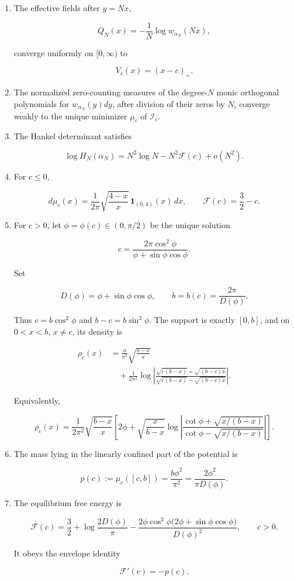 \documentclass[11pt]{article}
\theoremstyle{keio}
\theoremstyle{definition}
\theoremstyle{remark}
\begin{document}
\begin{enumerate}
\def\labelenumi{\arabic{enumi}.}
\item
  The effective fields after \(y=Nx\),

  \[
  Q_N(x)=-\frac1N\log w_{\alpha_N}(Nx),
  \]

  converge uniformly on \([0,\infty)\) to

  \[
  V_c(x)=(x-c)_+.
  \]
\item
  The normalized zero-counting measures of the degree-\(N\) monic
  orthogonal polynomials for \(w_{\alpha_N}(y)dy\), after division of their
  zeros by \(N\), converge weakly to the unique minimizer \(\mu_c\) of
  \(\mathcal I_c\).
\item
  The Hankel determinant satisfies

  \[
  \boxed{\ \log H_N(\alpha_N)
  =N^2\log N-N^2\mathcal F(c)+o(N^2).\ }
  \]
\item
  For \(c\le0\),

  \[
  d\mu_c(x)=\frac1{2\pi}\sqrt{\frac{4-x}{x}}\,
  \mathbf1_{(0,4)}(x)\,dx,
  \qquad
  \mathcal F(c)=\frac32-c.
  \]
\item
  For \(c>0\), let \(\phi=\phi(c)\in(0,\pi/2)\) be the unique solution

  \[
  \boxed{\ c=\frac{2\pi\cos^2\phi}
  {\phi+\sin\phi\cos\phi}.\ } \tag{DS-1.1}
  \]

  Set

  \[
  D(\phi)=\phi+\sin\phi\cos\phi,
  \qquad
  b=b(c)=\frac{2\pi}{D(\phi)}.
  \tag{DS-1.2}
  \]

  Thus \(c=b\cos^2\phi\) and \(b-c=b\sin^2\phi\). The support is exactly
  \([0,b]\), and on \(0<x<b\), \(x\ne c\), its density is

  \[
  \boxed{
  \begin{aligned}
  \rho_c(x)
  &=\frac{\phi}{\pi^2}\sqrt{\frac{b-x}{x}}\\
  &\quad+\frac1{2\pi^2}
  \log\left|
  \frac{\sqrt{c(b-x)}+\sqrt{(b-c)x}}
       {\sqrt{c(b-x)}-\sqrt{(b-c)x}}
  \right|.
  \end{aligned}} \tag{DS-1.3}
  \]

  Equivalently,

  \[
  \rho_c(x)=\frac1{2\pi^2}\sqrt{\frac{b-x}{x}}
  \left[
  2\phi+\sqrt{\frac{x}{b-x}}
  \log\left|
  \frac{\cot\phi+\sqrt{x/(b-x)}}
       {\cot\phi-\sqrt{x/(b-x)}}
  \right|
  \right]. \tag{DS-1.4}
  \]
\item
  The mass lying in the linearly confined part of the potential is

  \[
  \boxed{\ p(c):=\mu_c([c,b])
  =\frac{b\phi^2}{\pi^2}
  =\frac{2\phi^2}{\pi D(\phi)}.\ } \tag{DS-1.5}
  \]
\item
  The equilibrium free energy is

  \[
  \boxed{
  \mathcal F(c)=
  \frac32+\log\frac{2D(\phi)}\pi
  -\frac{2\phi\cos^2\phi
  \bigl(2\phi+\sin\phi\cos\phi\bigr)}{D(\phi)^2},
  \qquad c>0.} \tag{DS-1.6}
  \]

  It obeys the envelope identity

  \[
  \mathcal F'(c)=-p(c). \tag{DS-1.7}
  \]
\end{enumerate}
\end{document}
